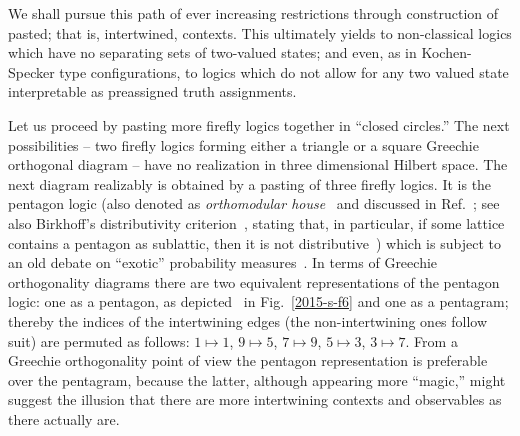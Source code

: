 \documentclass[%
  twocolumn,
 showpacs,
 showkeys,
 preprintnumbers,
 amsmath,amssymb,
 aps,
  pra,
  longbibliography,
 floatfix,
 ]{revtex4-1}
\begin{document}
We shall pursue this path of ever increasing restrictions through construction of pasted; that is, intertwined, contexts.
This ultimately
yields to non-classical logics which have no separating sets of two-valued states; and even, as
in Kochen-Specker type configurations,
to logics which do not allow for any two valued state interpretable as preassigned truth assignments.


Let us proceed by pasting more firefly logics together in ``closed circles.'' The next possibilities -- two firefly logics forming either a triangle or a square Greechie orthogonal
diagram -- have no realization in three dimensional Hilbert space.
The next diagram realizably is obtained by a pasting of three firefly logics.
It is the pentagon logic (also denoted as {\em orthomodular house}~\cite[p.~46, Fig.~4.4]{kalmbach-83}
and discussed in Ref.~\cite{Beltrametti-1995};
see also Birkhoff's distributivity criterion~\cite[p.~90, Theorem~33]{beran},
stating that, in particular,  if some lattice contains a pentagon as sublattic,
then it is not distributive~\cite{birkhoff_1934})
which is subject to an old debate on ``exotic'' probability measures~\cite{wright:pent}.
In terms of Greechie orthogonality diagrams  there are two
equivalent representations of the  pentagon logic: one as a pentagon, as depicted~\cite{svozil-2016-s} in  Fig.~\ref{2015-s-f6}
and one as a pentagram; thereby the indices of the intertwining edges
(the non-intertwining ones follow suit) are permuted as follows:
$1 \mapsto 1$,
$9 \mapsto 5$,
$7 \mapsto 9$,
$5 \mapsto 3$,
$3 \mapsto 7$.
From a Greechie orthogonality point of view the pentagon representation is preferable over the pentagram,
because the latter, although appearing more ``magic,''  might suggest the illusion that there are more intertwining contexts and observables as there actually are.
\end{document}

